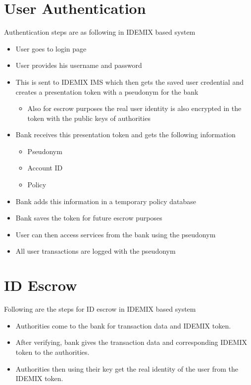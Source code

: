 \section{User Authentication}
Authentication steps are as following in IDEMIX based system
\begin{itemize}
	\item User goes to login page
	\item User provides his username and password
	\item This is sent to IDEMIX IMS which then gets the saved user credential and creates a presentation token with a pseudonym for the bank
	\begin{itemize}
		\item Also for escrow purposes the real user identity is also encrypted in the token with the public keys of authorities
	\end{itemize}
	\item Bank receives this presentation token and gets the following information
	\begin{itemize}
		\item Pseudonym
		\item Account ID
		\item Policy
	\end{itemize}
	\item Bank adds this information in a temporary policy database
	\item Bank saves the token for future escrow purposes
	\item User can then access services from the bank using the pseudonym
	\item All user transactions are logged with the pseudonym
\end{itemize}
\section{ID Escrow}
Following are the steps for ID escrow in IDEMIX based system
\begin{itemize}
	\item Authorities come to the bank for transaction data and IDEMIX token.
	\item After verifying, bank gives the transaction data and corresponding IDEMIX token to the authorities.
	\item Authorities then using their key get the real identity of the user from the IDEMIX token.
\end{itemize}
